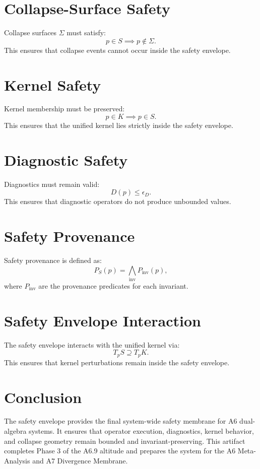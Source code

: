 \documentclass[11pt]{article}
\begin{document}
\section{Collapse-Surface Safety}
Collapse surfaces $\Sigma$ must satisfy:
\[
p \in S \implies p \notin \Sigma.
\]
This ensures that collapse events cannot occur inside the safety envelope.

\section{Kernel Safety}
Kernel membership must be preserved:
\[
p \in K \implies p \in S.
\]
This ensures that the unified kernel lies strictly inside the safety envelope.

\section{Diagnostic Safety}
Diagnostics must remain valid:
\[
D(p) \leq \epsilon_D.
\]
This ensures that diagnostic operators do not produce unbounded values.

\section{Safety Provenance}
Safety provenance is defined as:
\[
P_S(p) = \bigwedge_{\text{inv}} P_{\text{inv}}(p),
\]
where $P_{\text{inv}}$ are the provenance predicates for each invariant.

\section{Safety Envelope Interaction}
The safety envelope interacts with the unified kernel via:
\[
T_p S \supseteq T_p K.
\]
This ensures that kernel perturbations remain inside the safety envelope.

\section*{Conclusion}
The safety envelope provides the final system-wide safety membrane for A6
dual-algebra systems. It ensures that operator execution, diagnostics, kernel
behavior, and collapse geometry remain bounded and invariant-preserving. This
artifact completes Phase 3 of the A6.9 altitude and prepares the system for the
A6 Meta-Analysis and A7 Divergence Membrane.
\end{document}
